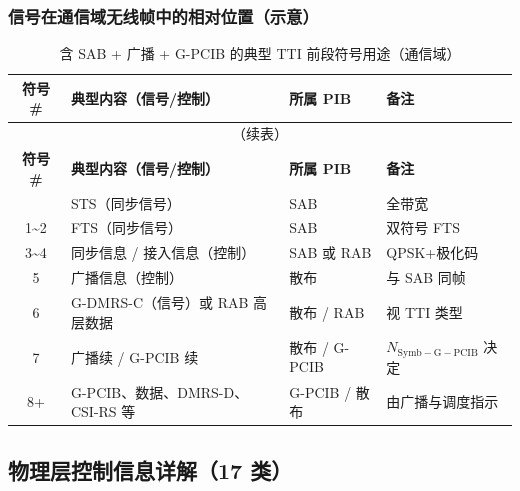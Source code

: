 \documentclass[11pt,a4paper]{ctexart}
\begin{document}
\subsubsection{信号在通信域无线帧中的相对位置（示意）}

\begin{longtable}{clll}
\caption{含 SAB + 广播 + G-PCIB 的典型 TTI 前段符号用途（通信域）} \\
\toprule
\textbf{符号 \#} & \textbf{典型内容（信号/控制）} & \textbf{所属 PIB} & \textbf{备注} \\
\midrule
\endfirsthead
\multicolumn{4}{c}{\small（续表）} \\
\toprule
\textbf{符号 \#} & \textbf{典型内容（信号/控制）} & \textbf{所属 PIB} & \textbf{备注} \\
\midrule
\endhead
\bottomrule
\endfoot
0 & STS（同步信号） & SAB & 全带宽 \\
1\textasciitilde 2 & FTS（同步信号） & SAB & 双符号 FTS \\
3\textasciitilde 4 & 同步信息 / 接入信息（控制） & SAB 或 RAB & QPSK+极化码 \\
5 & 广播信息（控制） & 散布 & 与 SAB 同帧 \\
6 & G-DMRS-C（信号）或 RAB 高层数据 & 散布 / RAB & 视 TTI 类型 \\
7 & 广播续 / G-PCIB 续 & 散布 / G-PCIB & $N_{\mathrm{Symb-G-PCIB}}$ 决定 \\
8+ & G-PCIB、数据、DMRS-D、CSI-RS 等 & G-PCIB / 散布 & 由广播与调度指示 \\
\end{longtable}

\subsection{物理层控制信息详解（17 类）}
\end{document}
